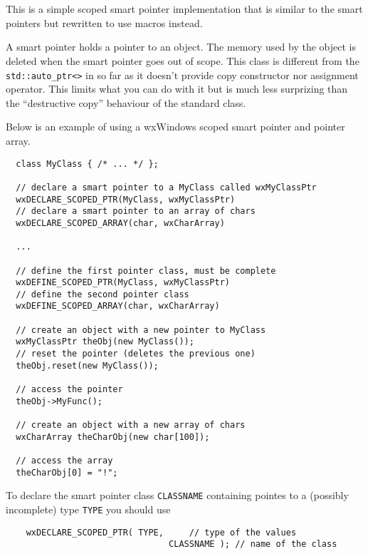 \section{}\label{wxscopedptr}

This is a simple scoped smart pointer implementation that is similar to 
the  smart pointers but rewritten to
use macros instead.

A smart pointer holds a pointer to an object. The memory used by the object is
deleted when the smart pointer goes out of scope. This class is different from
the \texttt{std::auto\_ptr<>} in so far as it doesn't provide copy constructor
nor assignment operator. This limits what you can do with it but is much less
surprizing than the ``destructive copy'' behaviour of the standard class.


Below is an example of using a wxWindows scoped smart pointer and 
pointer array.

\begin{verbatim}
  class MyClass { /* ... */ };

  // declare a smart pointer to a MyClass called wxMyClassPtr
  wxDECLARE_SCOPED_PTR(MyClass, wxMyClassPtr)
  // declare a smart pointer to an array of chars
  wxDECLARE_SCOPED_ARRAY(char, wxCharArray)

  ...

  // define the first pointer class, must be complete
  wxDEFINE_SCOPED_PTR(MyClass, wxMyClassPtr)
  // define the second pointer class
  wxDEFINE_SCOPED_ARRAY(char, wxCharArray)

  // create an object with a new pointer to MyClass
  wxMyClassPtr theObj(new MyClass());
  // reset the pointer (deletes the previous one)
  theObj.reset(new MyClass());

  // access the pointer
  theObj->MyFunc();

  // create an object with a new array of chars
  wxCharArray theCharObj(new char[100]);

  // access the array
  theCharObj[0] = "!";
\end{verbatim}


To declare the smart pointer class \texttt{CLASSNAME} containing pointes to a
(possibly incomplete) type \texttt{TYPE} you should use
\begin{verbatim}
    wxDECLARE_SCOPED_PTR( TYPE,     // type of the values
                                CLASSNAME ); // name of the class
\end{verbatim}

